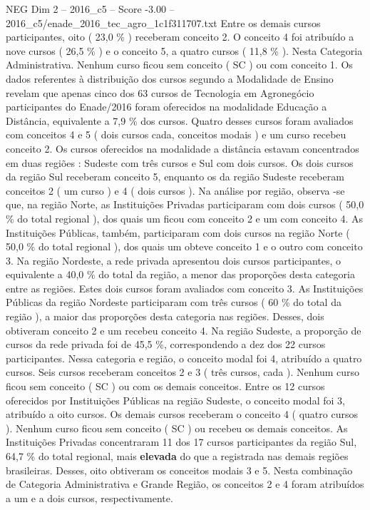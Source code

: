 \begin{textsample}{NEG Dim 2 – 2016\_c5 – Score -3.00 – 2016\_c5/enade\_2016\_tec\_agro\_1c1f311707.txt}
Entre os demais cursos participantes, oito ( 23,0 \% ) receberam conceito 2.
O conceito 4 foi atribuído a nove cursos ( 26,5 \% ) e o conceito 5, a quatro cursos ( 11,8 \% ).
Nesta Categoria Administrativa.
Nenhum curso ficou sem conceito ( SC ) ou com conceito 1.
Os dados referentes à distribuição dos cursos segundo a Modalidade de Ensino revelam que apenas cinco dos 63 cursos de Tecnologia em Agronegócio participantes do Enade/2016 foram oferecidos na modalidade Educação a Distância, equivalente a 7,9 \% dos cursos.
Quatro desses cursos foram avaliados com conceitos 4 e 5 ( dois cursos cada, conceitos modais ) e um curso recebeu conceito 2.
Os cursos oferecidos na modalidade a distância estavam concentrados em duas regiões : Sudeste com três cursos e Sul com dois cursos.
Os dois cursos da região Sul receberam conceito 5, enquanto os da região Sudeste receberam conceitos 2 ( um curso ) e 4 ( dois cursos ).
Na análise por região, observa -se que, na região Norte, as Instituições Privadas participaram com dois cursos ( 50,0 \% do total regional ), dos quais um ficou com conceito 2 e um com conceito 4.
As Instituições Públicas, também, participaram com dois cursos na região Norte ( 50,0 \% do total regional ), dos quais um obteve conceito 1 e o outro com conceito 3.
Na região Nordeste, a rede privada apresentou dois cursos participantes, o equivalente a 40,0 \% do total da região, a menor das proporções desta categoria entre as regiões.
Estes dois cursos foram avaliados com conceito 3.
As Instituições Públicas da região Nordeste participaram com três cursos ( 60 \% do total da região ), a maior das proporções desta categoria nas regiões.
Desses, dois obtiveram conceito 2 e um recebeu conceito 4.
Na região Sudeste, a proporção de cursos da rede privada foi de 45,5 \%, correspondendo a dez dos 22 cursos participantes.
Nessa categoria e região, o conceito modal foi 4, atribuído a quatro cursos.
Seis cursos receberam conceitos 2 e 3 ( três cursos, cada ).
Nenhum curso ficou sem conceito ( SC ) ou com os demais conceitos.
Entre os 12 cursos oferecidos por Instituições Públicas na região Sudeste, o conceito modal foi 3, atribuído a oito cursos.
Os demais cursos receberam o conceito 4 ( quatro cursos ).
Nenhum curso ficou sem conceito ( SC ) ou recebeu os demais conceitos.
As Instituições Privadas concentraram 11 dos 17 cursos participantes da região Sul, 64,7 \% do total regional, mais \textbf{elevada} do que a registrada nas demais regiões brasileiras.
Desses, oito obtiveram os conceitos modais 3 e 5.
Nesta combinação de Categoria Administrativa e Grande Região, os conceitos 2 e 4 foram atribuídos a um e a dois cursos, respectivamente.

\end{textsample}
